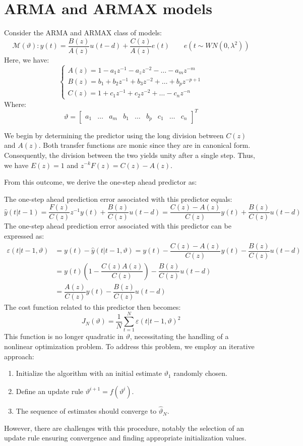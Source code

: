 \section{ARMA and ARMAX models}

Consider the ARMA and ARMAX class of models:
\[\mathcal{M}(\vartheta): y(t)=\dfrac{B(z)}{A(z)}u(t-d)+\dfrac{C(z)}{A(z)}e(t)\qquad e(t \sim WN(0,\lambda^2))\]
Here, we have:
\[\begin{cases}
    A(z)=1-a_1z^{-1}-a_zz^{-2}-\dots-a_mz^{-m} \\
    B(z)=b_1+b_2z^{-1}+b_3z^{-2}+\dots+b_pz^{-p+1} \\
    C(z)=1+c_1z^{-1}+c_2z^{-2}+\dots-c_nz^{-n}
\end{cases}\]
Where: 
\[\vartheta=\begin{bmatrix}
    a_1 & \dots & a_m & b_1 & \dots & b_p & c_1 & \dots & c_n
\end{bmatrix}^T\]

We begin by determining the predictor using the long division between $C(z)$ and $A(z)$. 
Both transfer functions are monic since they are in canonical form. 
Consequently, the division between the two yields unity after a single step. 
Thus, we have $E(z)=1$ and $z^{-k}F(z)=C(z)-A(z)$.

From this outcome, we derive the one-step ahead predictor as:

The one-step ahead prediction error associated with this predictor equals:
\[\hat{y}(t|t-1)=\dfrac{F(z)}{C(z)}z^{-1}y(t)+\dfrac{B(z)}{C(z)}u(t-d)=\dfrac{C(z)-A(z)}{C(z)}y(t)+\dfrac{B(z)}{C(z)}u(t-d)\]
The one-step ahead prediction error associated with this predictor can be expressed as:
\begin{align*}
    \varepsilon(t|t-1,\vartheta)&=y(t)-\hat{y}(t|t-1,\vartheta)=y(t)-\dfrac{C(z)-A(z)}{C(z)}y(t)-\dfrac{B(z)}{C(z)}u(t-d)\\
                                &=y(t)\left(1-\dfrac{C(z)A(z)}{C(z)}\right) - \dfrac{B(z)}{C(z)}u(t-d) \\
                                &=\dfrac{A(z)}{C(z)}y(t)-\dfrac{B(z)}{C(z)}u(t-d)
\end{align*}
The cost function related to this predictor then becomes:
\[J_N(\vartheta)=\dfrac{1}{N}\sum_{t=1}^N \varepsilon(t|t-1,\vartheta)^2\]
This function is no longer quadratic in $\vartheta$, necessitating the handling of a nonlinear optimization problem.
To address this problem, we employ an iterative approach:
\begin{enumerate}
    \item Initialize the algorithm with an initial estimate $\vartheta_1$ randomly chosen.
    \item Define an update rule $\vartheta^{i+1}=f\left(\vartheta^{i}\right)$.
    \item The sequence of estimates should converge to $\hat{\vartheta}_N$.
\end{enumerate}
However, there are challenges with this procedure, notably the selection of an update rule ensuring convergence and finding appropriate initialization values.

